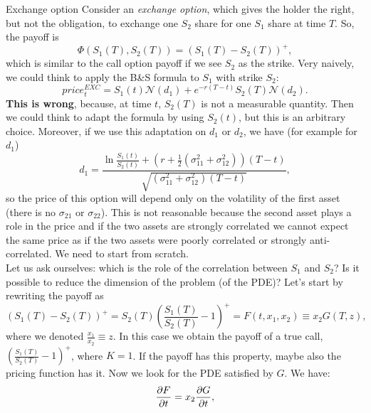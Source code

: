 \begin{example}{Exchange option}{}{}
    Consider an \emph{exchange option}, which gives the holder the right, but not the obligation, to exchange one $S_2$ share for one $S_1$ share at time $T$. So, the payoff is
    \begin{equation}
        \Phi(S_1(T),S_2(T)) = (S_1(T)-S_2(T))^+,
    \end{equation}
    which is similar to the call option payoff if we see $S_2$ as the strike. Very naively, we could think to apply the B\&S formula to $S_1$ with strike $S_2$:
    \begin{equation}
        price_t^{EXC} = S_1(t)\mathcal{N}(d_1) + e^{-r(T-t)}S_2(T)\mathcal{N}(d_2).
    \end{equation}
    \textbf{This is wrong}, because, at time $t$, $S_2(T)$ is not a measurable quantity. Then we could think to adapt the formula by using $S_2(t)$, but this is an arbitrary choice. Moreover, if we use this adaptation on $d_1$ or $d_2$, we have (for example for $d_1$)
    \begin{equation}
        d_1 = \dfrac{\ln\frac{S_1(t)}{S_2(t)}+\left(r+\frac{1}{2}(\sigma_{11}^2 + \sigma_{12}^2)\right)(T-t)}{\sqrt{(\sigma_{11}^2 + \sigma_{12}^2)(T-t)}},
    \end{equation}
    so the price of this option will depend only on the volatility of the first asset (there is no $\sigma_{21}$ or $\sigma_{22}$). This is not reasonable because the second asset plays a role in the price and if the two assets are strongly correlated we cannot expect the same price as if the two assets were poorly correlated or strongly anti-correlated. We need to start from scratch.\\
    Let us ask ourselves: which is the role of the correlation between $S_1$ and $S_2$? Is it possible to reduce the dimension of the problem (of the PDE)? Let's start by rewriting the payoff as
    \begin{equation}
        (S_1(T)-S_2(T))^+ = S_2(T)\left(\dfrac{S_1(T)}{S_2(T)}-1\right)^+ = F(t,x_1,x_2) \equiv x_2 G(T,z),
    \end{equation}
    where we denoted $\tfrac{x_1}{x_2}\equiv z$. In this case we obtain the payoff of a true call, $\left(\tfrac{S_1(T)}{S_2(T)}-1\right)^+$, where $K=1$. If the payoff has this property, maybe also the pricing function has it. Now we look for the PDE satisfied by $G$. We have:
    \begin{align*}
        \pdv{F}{t} &= x_2\pdv{G}{t}, \\

\end{align*}
\end{example}
